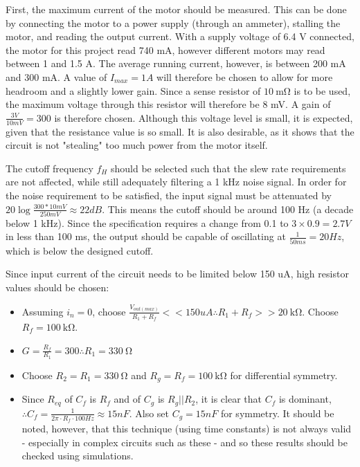 First, the maximum current of the motor should be measured. This can be done by connecting the motor to a power supply (through an ammeter), stalling the motor, and reading the output current.
With a supply voltage of 6.4 V connected, the motor for this project read 740 mA, however different motors may read between 1 and 1.5 A. The average running current, however, is between 200 mA
and 300 mA. A value of $I_{max} = 1 A$ will therefore be chosen to allow for more headroom and a slightly lower gain.
Since a sense resistor of $\SI{10}{\milli\ohm}$ is to be used, the maximum voltage through this resistor will therefore be 8 mV. A gain of $\frac{3 V}{10 mV} = 300$ is therefore chosen.
Although this voltage level is small, it is expected, given that the resistance value is so small. It is also desirable, as it shows that the circuit is not "stealing" too much power from the motor itself.

The cutoff frequency $f_H$ should be selected such that the slew rate requirements are not affected, while still adequately filtering a 1 kHz noise signal. In order for the noise requirement
to be satisfied, the input signal must be attenuated by $20 \log{\frac{300 * 10 mV}{250 mV}} \approx 22 dB$. This means the cutoff should be around 100 Hz (a decade below 1 kHz).
Since the specification requires a change from 0.1 to $3 \times 0.9 = 2.7 V$ in less than 100 ms, the output should be capable of oscillating at $\frac{1}{50 ms} = 20 Hz$, which is below the designed cutoff.

Since input current of the circuit needs to be limited below 150 uA, high resistor values should be chosen:
\begin{itemize}
  \item Assuming $i_n = 0$, choose $\frac{V_{out(max)}}{R_1 + R_f} << 150 uA \therefore R_1 + R_f >> \SI{20}{\kilo\ohm}$. Choose $R_f = \SI{100}{\kilo\ohm}$.
  \item $G = \frac{R_f}{R_1} = 300 \therefore R_1 = \SI{330}{\ohm}$
  \item Choose $R_2 = R_1 = \SI{330}{\ohm}$ and $R_g = R_f = \SI{100}{\kilo\ohm}$ for differential symmetry.
  \item Since $R_{eq}$ of $C_f$ is $R_f$ and of $C_g$ is $R_g || R_2$, it is clear that $C_f$ is dominant, $\therefore C_f = \frac{1}{2 \pi \cdot R_f \cdot 100 Hz} \approx 15 nF$. Also set $C_g = 15nF$ for symmetry.
        It should be noted, however, that this technique (using time constants) is not always valid - especially in complex circuits such as these - and so these results should be checked using simulations.
\end{itemize}

